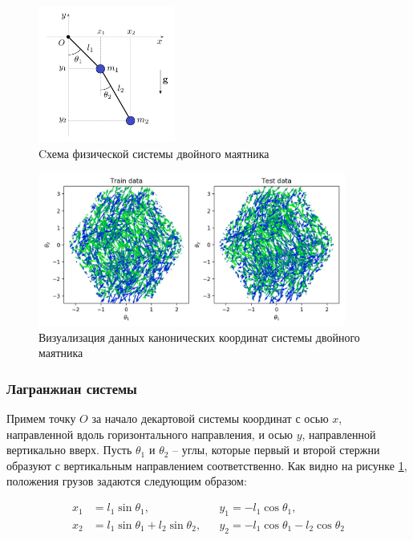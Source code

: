 \documentclass[12pt]{article}
\begin{document}
	\begin{figure}[H]
			\centering
			\includegraphics[width=0.4\textwidth]{double_pendulum_scheme.png}
			\caption{Cхема физической системы двойного маятника}
			\label{fig:pendulum_system}
	\end{figure}
	\begin{figure}[H]
	\centering
	\includegraphics[width=0.9\textwidth]{train_test_data_vis.png}
	\caption{Визуализация данных канонических координат системы двойного маятника}
	\label{fig:canon}
\end{figure}

	\subsubsection{Лагранжиан системы}
	
	Примем точку $O$ за начало декартовой системы координат с осью $x$, направленной вдоль горизонтального направления, и осью $y$, направленной вертикально вверх. Пусть $\theta_1$ и $\theta_2$ -- углы, которые первый и второй стержни образуют с вертикальным направлением соответственно. Как видно на рисунке \ref{fig:pendulum_system}, положения грузов задаются следующим образом:
	
	$$
	\begin{aligned}
	x_{1} & =l_{1} \sin \theta_{1}, && y_{1}=-l_{1} \cos \theta_{1}, \\
	x_{2} & =l_{1} \sin \theta_{1}+l_{2} \sin \theta_{2}, &&  y_{2}=-l_{1} \cos \theta_{1}-l_{2} \cos \theta_{2}
	\end{aligned}
	$$
	
\end{document}
